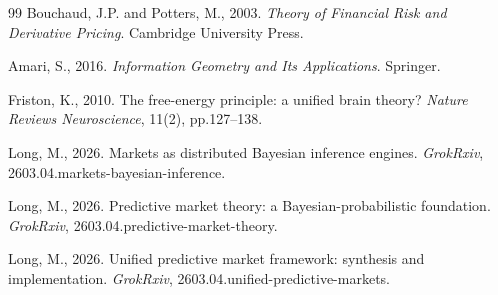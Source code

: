 \documentclass[12pt,a4paper]{article}
\theoremstyle{definition}
\begin{document}
\begin{thebibliography}{99}
 Bouchaud, J.P. and Potters, M., 2003. \textit{Theory of Financial Risk and Derivative Pricing}. Cambridge University Press.

 Amari, S., 2016. \textit{Information Geometry and Its Applications}. Springer.

 Friston, K., 2010. The free-energy principle: a unified brain theory? \textit{Nature Reviews Neuroscience}, 11(2), pp.127--138.

 Long, M., 2026. Markets as distributed Bayesian inference engines. \textit{GrokRxiv}, 2603.04.markets-bayesian-inference.

 Long, M., 2026. Predictive market theory: a Bayesian-probabilistic foundation. \textit{GrokRxiv}, 2603.04.predictive-market-theory.

 Long, M., 2026. Unified predictive market framework: synthesis and implementation. \textit{GrokRxiv}, 2603.04.unified-predictive-markets.

\end{thebibliography}
\end{document}
